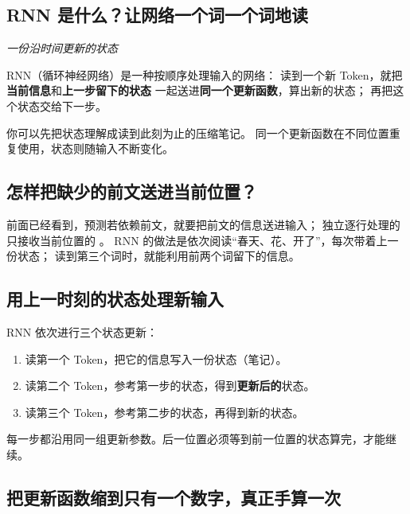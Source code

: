 \subsection{RNN 是什么？让网络一个词一个词地读}
\label{concept:rnn}
\begin{idea}
\noindent\emph{一份沿时间更新的状态}\par

RNN（循环神经网络）是一种按顺序处理输入的网络：
读到一个新 Token，就把\textbf{当前信息}和\textbf{上一步留下的状态}
一起送进\textbf{同一个更新函数}，算出新的状态；
再把这个状态交给下一步。

你可以先把状态理解成读到此刻为止的压缩笔记。
同一个更新函数在不同位置重复使用，状态则随输入不断变化。
\end{idea}

\subsection{怎样把缺少的前文送进当前位置？}

前面已经看到，预测若依赖前文，就要把前文的信息送进输入；
独立逐行处理的  只接收当前位置的 。
RNN 的做法是依次阅读“春天、花、开了”，每次带着上一份状态；
读到第三个词时，就能利用前两个词留下的信息。

\subsection{用上一时刻的状态处理新输入}
\label{concept:hidden-state}

RNN 依次进行三个状态更新：
\begin{enumerate}
\item 读第一个 Token，把它的信息写入一份状态（笔记）。
\item 读第二个 Token，参考第一步的状态，得到\textbf{更新后的}状态。
\item 读第三个 Token，参考第二步的状态，再得到新的状态。
\end{enumerate}


每一步都沿用同一组更新参数。后一位置必须等到前一位置的状态算完，才能继续。

\subsection{把更新函数缩到只有一个数字，真正手算一次}

